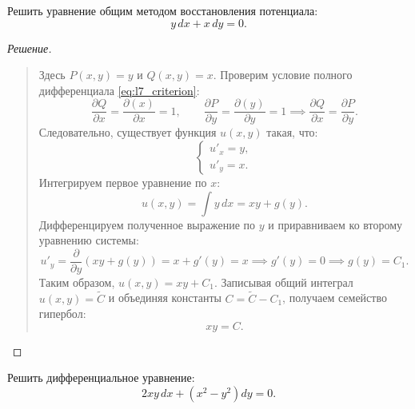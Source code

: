 \begin{example}
    Решить уравнение общим методом восстановления потенциала:
    \begin{equation} \label{eq:l7_ex1}
        y \, dx + x \, dy = 0. \tag{12}
    \end{equation}

    \begin{proof}[Решение]~\\
        \begin{quote}
            Здесь $P(x, y) = y$ и $Q(x, y) = x$. Проверим условие полного
            дифференциала \eqref{eq:l7_criterion}:
            \[
                \frac{\partial Q}{\partial x} = \frac{\partial (x)}{\partial x}
                = 1, \qquad
                \frac{\partial P}{\partial y} = \frac{\partial (y)}{\partial y}
                = 1 \implies
                \frac{\partial Q}{\partial x} = \frac{\partial P}{\partial y}.
            \]
            Следовательно, существует функция $u(x, y)$ такая, что:
            \[
                \begin{cases}
                    u'_x = y, \\
                    u'_y = x.
                \end{cases}
            \]
            Интегрируем первое уравнение по $x$:
            \[
                u(x, y) = \int y \, dx = x y + g(y).
            \]
            Дифференцируем полученное выражение по $y$ и приравниваем ко
            второму уравнению системы:
            \[
                u'_y = \frac{\partial}{\partial y} \left(x y + g(y)\right) =
                x + g'(y) = x \implies g'(y) = 0 \implies g(y) = C_1.
            \]
            Таким образом, $u(x, y) = x y + C_1$. Записывая общий интеграл
            $u(x, y) = \tilde{C}$ и объединяя константы $C = \tilde{C} - C_1$,
            получаем семейство гипербол:
            \[
                x y = C.
            \]
        \end{quote}
    \end{proof}
\end{example}

\begin{problem}[Ф.186]
    Решить дифференциальное уравнение:
    \begin{equation} \label{eq:l7_f186}
        2 x y \, dx + \left(x^2 - y^2\right) dy = 0. \tag{13}
    \end{equation}
\end{problem}

